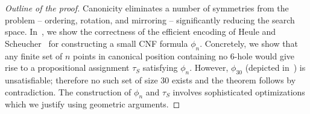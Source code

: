 \begin{proof}[Outline of the proof]
Canonicity eliminates a number of symmetries from the problem --
ordering, rotation, and mirroring --
significantly reducing the search space.
In~, we show the correctness of the efficient encoding of Heule and Scheucher~\cite{emptyHexagonNumber} for constructing
a small CNF formula $\phi_n$. Concretely, we show that any finite set of $n$ points in canonical position
containing no $6$-hole
would give rise to a propositional assignment $\tau_S$ satisfying $\phi_n$.
However, $\phi_{30}$ (depicted in~) is unsatisfiable;
therefore no such set of size $30$ exists
and the theorem follows by contradiction.
The construction of $\phi_n$ and $\tau_S$
involves sophisticated optimizations
which we justify using geometric arguments.
\end{proof}



